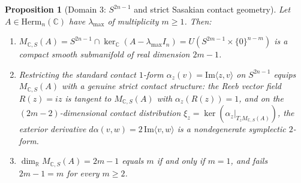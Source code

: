 \documentclass[11pt,a4paper]{article}
\newtheorem{proposition}[theorem]{Proposition}
\theoremstyle{definition}
\theoremstyle{remark}
\newcommand{\RR}{\mathbb{R}}
\newcommand{\CC}{\mathbb{C}}
\newcommand{\Herm}{\mathrm{Herm}}
\newcommand{\im}{\mathrm{Im}}
\begin{document}
\begin{proposition}[Domain 3: $S^{2n-1}$ and strict Sasakian contact geometry]
\label{prop:complex_sphere}
Let $A \in \Herm_n(\CC)$ have $\lambda_{\max}$ of multiplicity $m \ge 1$. Then:
\begin{enumerate}
  \item[(a)] $M_{\CC, S}(A) = S^{2n-1} \cap \ker_{\CC}(A - \lambda_{\max} I_n) = U(S^{2m-1} \times \{0\}^{n-m})$ is a compact smooth submanifold of real dimension $2m - 1$.
  \item[(b)] Restricting the standard contact $1$-form $\alpha_z(v) = \im\langle z, v \rangle$ on $S^{2n-1}$ equips $M_{\CC, S}(A)$ with a genuine \emph{strict contact structure}: the Reeb vector field $R(z) = i z$ is tangent to $M_{\CC, S}(A)$ with $\alpha_z(R(z)) = 1$, and on the $(2m - 2)$-dimensional contact distribution $\xi_z = \ker(\alpha_z|_{T_z M_{\CC, S}(A)})$, the exterior derivative $d\alpha(v, w) = 2\,\im\langle v, w \rangle$ is a nondegenerate symplectic $2$-form.
  \item[(c)] $\dim_{\RR} M_{\CC, S}(A) = 2m - 1$ equals $m$ \emph{if and only if} $m = 1$, and fails $2m - 1 = m$ for every $m \ge 2$.
\end{enumerate}
\end{proposition}
\end{document}

